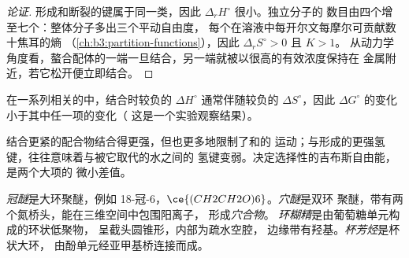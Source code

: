 \begin{proof}[论证]
形成和断裂的键属于同一类，因此 $\Delta_rH^\circ$ 很小。独立分子的
数目由四个增至七个：整体分子多出三个平动自由度，
每个在溶液中每开尔文每摩尔可贡献数十焦耳的熵
（\cref{ch:b3:partition-functions}），因此 $\Delta_rS^\circ > 0$ 且 $K > 1$。
从动力学角度看，螯合配体的一端一旦结合，另一端就被以很高的有效浓度保持在
金属附近，若它松开便立即结合。
\end{proof}

\begin{proposition}[焓–熵补偿]\label{prop:b3:supramolecular:compensation}
在一系列相关的中，结合时较负的 $\Delta H^\circ$
通常伴随较负的 $\Delta S^\circ$，因此 $\Delta G^\circ$ 的变化小于其中任一项的变化（
这是一个实验观察结果）。
\end{proposition}

结合更紧的配合物结合得更强，但也更多地限制了和的
运动；与形成的更强氢键，往往意味着与被它取代的水之间的
氢键变弱。决定选择性的吉布斯自由能，是两个大项的
微小差值。

\begin{definition}[主体]\label{def:b3:supramolecular:hosts}
\emph{冠醚}是大环聚醚，例如
18-冠-6，$\ce{(CH2CH2O)6}$。\emph{穴醚}是双环
聚醚，带有两个氮桥头，能在三维空间中包围阳离子，
形成\emph{穴合物}。
\emph{环糊精}是由葡萄糖单元构成的环状低聚物，
呈截头圆锥形，内部为疏水空腔，
边缘带有羟基。\emph{杯芳烃}是杯状大环，
由酚单元经亚甲基桥连接而成。
\end{definition}

